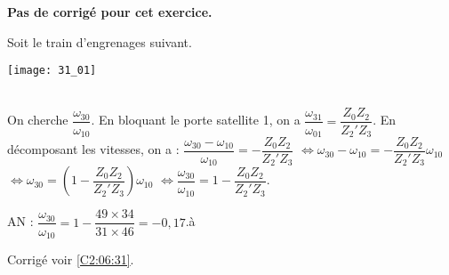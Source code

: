 \normaltrue \difficilefalse \tdifficilefalse
\correctiontrue


\ifcorrection
\else
\textbf{Pas de corrigé pour cet exercice.}
\fi

\ifprof
\else
Soit le train d'engrenages suivant. 
\begin{center}
\texttt{[image: 31\_01]}
\end{center}
\fi


\ifprof
\else
\fi

\ifprof ~\\
On cherche $\dfrac{\omega_{30}}{\omega_{10}}$. En bloquant le porte satellite 1, on a  
$\dfrac{\omega_{31}}{\omega_{01}}=\dfrac{Z_0 Z_2 }{Z_2' Z_3}$. En décomposant les vitesses, on a :
$\dfrac{\omega_{30}-\omega_{10}}{\omega_{10}}=-\dfrac{Z_0 Z_2 }{Z_2' Z_3}$
$\Leftrightarrow \omega_{30}-\omega_{10}=-\dfrac{Z_0 Z_2 }{Z_2' Z_3}\omega_{10}$
$\Leftrightarrow \omega_{30}=\left(1-\dfrac{Z_0 Z_2 }{Z_2' Z_3}\right)\omega_{10}$
$\Leftrightarrow \dfrac{\omega_{30}}{\omega_{10}}=1-\dfrac{Z_0 Z_2 }{Z_2' Z_3}$.

AN : $ \dfrac{\omega_{30}}{\omega_{10}}=1-\dfrac{49 \times 34}{31 \times 46}=-0,17$.à
\else
\fi


\ifprof
\else
\begin{flushright}
\footnotesize{Corrigé  voir \ref{C2:06:31}.}
\end{flushright}%
\fi